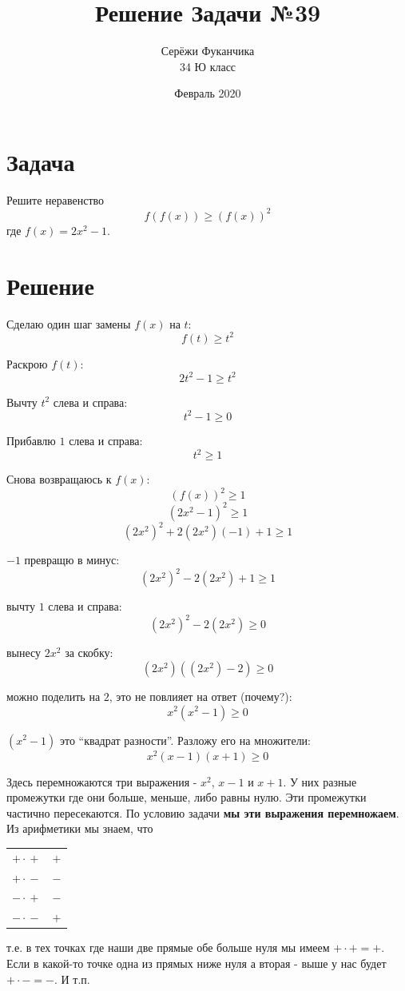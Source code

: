 \documentclass{article}
\title{Решение Задачи №39}
\author{Серёжи Фуканчика\\34 Ю класс}
\date{Февраль 2020}
\begin{document}
\maketitle

\section{Задача}
Решите неравенство
$$f(f(x))\ge{}(f(x))^2$$
где $f(x)=2x^2-1$.

\section{Решение}
Сделаю один шаг замены $f(x)$ на $t$:
$$f(t)\ge{}t^2$$

Раскрою $f(t)$:
$$2t^2-1\ge{}t^2$$

Вычту $t^2$ слева и справа:
$$t^2-1\ge{}0$$

Прибавлю $1$ слева и справа:
$$t^2\ge{}1$$

Снова возвращаюсь к $f(x)$:
$$(f(x))^2\ge{}1$$
$$(2x^2-1)^2\ge{}1$$
$$(2x^2)^2+2(2x^2)(-1)+1\ge{}1$$

$-1$ превращю в минус:
$$(2x^2)^2-2(2x^2)+1\ge{}1$$

вычту $1$ слева и справа:
$$(2x^2)^2-2(2x^2)\ge{}0$$

вынесу $2x^2$ за скобку:
$$(2x^2)((2x^2)-2)\ge{}0$$

можно поделить на $2$, это не повлияет на ответ (\small{почему?}):
$$x^2(x^2-1)\ge{}0$$

$(x^2-1)$ это ``квадрат разности''. Разложу его на множители:
$$x^2(x-1)(x+1)\ge{}0$$

Здесь перемножаются три выражения - $x^2$, $x-1$ и $x+1$. У них разные промежутки где они больше, меньше, либо равны нулю. Эти промежутки частично пересекаются. По условию задачи \textbf{мы эти выражения перемножаем}. Из арифметики мы знаем, что

\begin{tabular}{|c|c|}
\hline
     $+\cdot{}+$ & $+$ \\
     $+\cdot{}-$ & $-$ \\
     $-\cdot{}+$ & $-$ \\
     $-\cdot{}-$ & $+$ \\
\hline
\end{tabular}

т.е. в тех точках где наши две прямые обе больше нуля мы имеем $+\cdot{}+=+$. Если в какой-то точке одна из прямых ниже нуля а вторая - выше у нас будет $+\cdot{}-=-$. И т.п.
\end{document}
